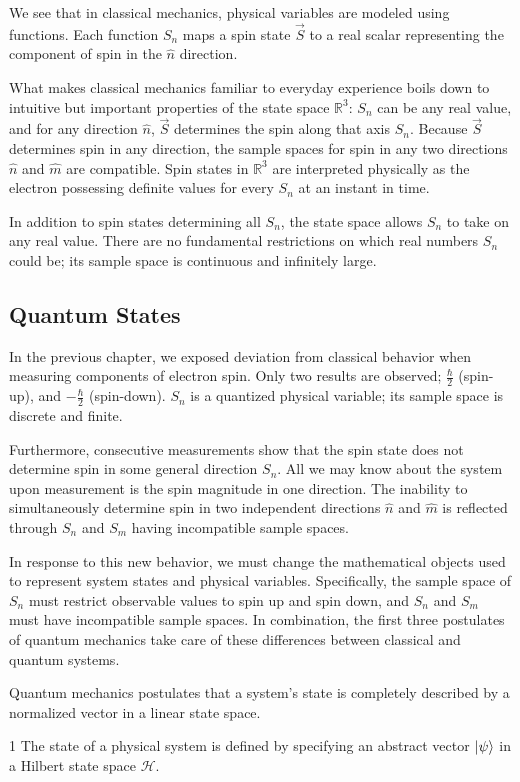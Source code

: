 We see that in classical mechanics, physical variables are modeled using functions. Each function $S_n$ maps a spin state $\vec{S}$ to a real scalar representing the component of spin in the $\hat{n}$ direction.

What makes classical mechanics familiar to everyday experience boils down to intuitive but important properties of the state space $\mathbb{R}^3$:  $S_n$ can be any real value, and for any direction $\hat{n}$, $\vec{S}$ determines the spin along that axis $S_n$. Because $\vec{S}$ determines spin in any direction, the sample spaces for spin in any two directions $\hat{n}$ and $\hat{m}$ are compatible. Spin states in $\mathbb{R}^3$ are interpreted physically as the electron possessing definite values for every $S_n$ at an instant in time.

In addition to spin states determining all $S_n$, the state space allows $S_n$ to take on any real value. There are no fundamental restrictions on which real numbers $S_n$ could be; its sample space is continuous and infinitely large.

\subsection{Quantum States}
In the previous chapter, we exposed deviation from classical behavior when measuring components of electron spin. Only two results are observed; $\frac{\hbar}{2}$ (spin-up), and $-\frac{\hbar}{2}$ (spin-down). $S_n$ is a quantized physical variable; its sample space is discrete and finite.

Furthermore, consecutive measurements show that the spin state does not determine spin in some general direction $S_n$. All we may know about the system upon measurement is the spin magnitude in one direction. The inability to simultaneously determine spin in two independent directions $\hat{n}$ and $\hat{m}$ is reflected through $S_n$ and $S_m$ having incompatible sample spaces.

In response to this new behavior, we must change the mathematical objects used to represent system states and physical variables. Specifically, the sample space of $S_n$ must restrict observable values to spin up and spin down, and $S_n$ and $S_m$ must have incompatible sample spaces. In combination, the first three postulates of quantum mechanics take care of these differences between classical and quantum systems.

Quantum mechanics postulates that a system's state is completely described by a normalized vector in a linear state space.
\begin{Thm:Postulate}{1}
    The state of a physical system is defined by specifying an abstract vector $\ket{\psi}$ in a Hilbert state space $\mathcal{H}$.
\end{Thm:Postulate}

